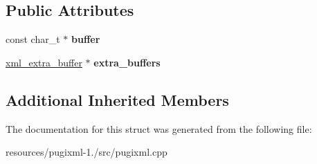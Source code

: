 \subsection*{Public Attributes}
\begin{DoxyCompactItemize}
\item 
\hypertarget{structxml__document__struct_a120451f29b8cc2a82a3ecc926449ea0e}{const char\+\_\+t $\ast$ {\bfseries buffer}}\label{structxml__document__struct_a120451f29b8cc2a82a3ecc926449ea0e}

\item 
\hypertarget{structxml__document__struct_afe3b1efd5b683c306157244496f55c4b}{\hyperlink{structxml__extra__buffer}{xml\+\_\+extra\+\_\+buffer} $\ast$ {\bfseries extra\+\_\+buffers}}\label{structxml__document__struct_afe3b1efd5b683c306157244496f55c4b}

\end{DoxyCompactItemize}
\subsection*{Additional Inherited Members}


The documentation for this struct was generated from the following file\+:\begin{DoxyCompactItemize}
\item 
resources/pugixml-\/1./src/pugixml.\+cpp\end{DoxyCompactItemize}
